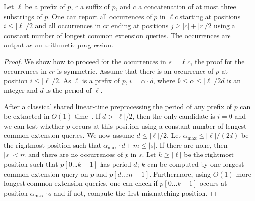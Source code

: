 \begin{proposition}\label{claim:big_overlap}
Let $\ell$ be a prefix of $p$, $r$ a suffix of $p$, and $c$ a concatenation of at most three substrings of $p$. One can report all occurrences of $p$ in $\ell c$ starting at positions $i \leq |\ell|/2$ and all occurrences in $cr$ ending at positions $j \geq |c|+|r|/2$ using a constant number of longest common extension queries.
%
The occurrences are output as an arithmetic progression.
\end{proposition}
\begin{proof}
We show how to proceed for the occurrences in $s = \ell c$, the proof for the occurrences in $c r$ is symmetric. Assume that there is an occurrence of $p$ at position $i \leq |\ell|/2$. As $\ell$ is a prefix of $p$, $i= \alpha \cdot d$, where $0 \leq \alpha \leq |\ell|/2d$ is an integer and $d$ is the period of $\ell$. 

After a classical shared linear-time preprocessing the period of any prefix of $p$ can be extracted in $O(1)$ time~\cite{KMP}. If $d >|\ell|/2$, then the only candidate is $i=0$ and we can test whether $p$ occurs at this position using a constant number of longest common extension queries.
We now assume $d \leq |\ell|/2$. Let $\alpha_{\max} \leq |\ell|/(2d)$ be the rightmost position such that $\alpha_{\max} \cdot d +m \leq |s|$. If there are none, then $|s| < m$ and there are no occurrences of $p$ in $s$. Let $k \geq |\ell|$ be the rightmost position such that $p[0 \dots k-1]$ has period $d$; $k$ can be computed by one longest common extension query on $p$ and $p[d \dots m-1]$. Furthermore, using $O(1)$ more longest common extension queries, one can check if $p[0 \dots k-1]$ occurs at position $\alpha_{\max} \cdot d$ and if not, compute the first mismatching position.


\end{proof}
